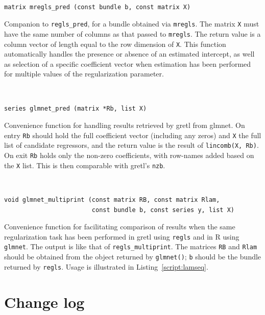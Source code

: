 \documentclass{article}
\newenvironment{funcdoc}
{\noindent\hrulefill\\[-12pt]}
{\medbreak}
\begin{document}
\begin{funcdoc}
\begin{verbatim}
matrix mregls_pred (const bundle b, const matrix X)
\end{verbatim}
  Companion to \texttt{regls\_pred}, for a bundle obtained via
  \texttt{mregls}. The matrix \texttt{X} must have the same number of
  columns as that passed to \texttt{mregls}. The return value is a
  column vector of length equal to the row dimension of \texttt{X}.
  This function automatically handles the presence or absence of an
  estimated intercept, as well as selection of a specific coefficient
  vector when estimation has been performed for multiple values of the
  regularization parameter.
\end{funcdoc}

\begin{funcdoc}
\begin{verbatim}
series glmnet_pred (matrix *Rb, list X)
\end{verbatim}
  Convenience function for handling results retrieved by gretl from
  \textsf{glmnet}. On entry \texttt{Rb} should hold the full
  coefficient vector (including any zeros) and \texttt{X} the full
  list of candidate regressors, and the return value is the result of
  \texttt{lincomb(X, Rb)}. On exit \texttt{Rb} holds only the non-zero
  coefficients, with row-names added based on the \texttt{X}
  list. This is then comparable with gretl's \texttt{nzb}.
\end{funcdoc}

\begin{funcdoc}
\begin{verbatim}
void glmnet_multiprint (const matrix RB, const matrix Rlam,
                        const bundle b, const series y, list X)
\end{verbatim}
  Convenience function for facilitating comparison of results when the
  same regularization task has been performed in gretl using
  \texttt{regls} and in \textsf{R} using \texttt{glmnet}. The output
  is like that of \texttt{regls\_multiprint}.  The matrices
  \texttt{RB} and \texttt{Rlam} should be obtained from the object
  returned by \texttt{glmnet()}; \texttt{b} should be the bundle
  returned by \texttt{regls}.  Usage is illustrated in
  Listing~\ref{script:lamseq}.
\end{funcdoc}

\section{Change log}
\label{sec:changes}
\end{document}
